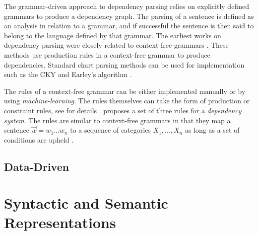 The grammar-driven approach to dependency parsing relies on explicitly defined grammars to produce a dependency graph. The parsing of a sentence is defined as an analysis in relation to a grammar, and if successful the sentence is then said to belong to the language defined by that grammar. The earliest works on dependency parsing were closely related to context-free grammars \cite{KublerEtAl:09}. These methods use production rules in a context-free grammar to produce dependencies. Standard chart parsing methods can be used for implementation such as the CKY \cite{Younger:67} and Earley's algorithm \cite{Early:70}.

The rules of a context-free grammar can be either implemented manually or by using \textit{machine-learning}. The rules themselves can take the form of production or constraint rules, see \citeauthor{KublerEtAl:09} for details \cite{KublerEtAl:09}. \citeauthor{Gaifman:65} proposes a set of three rules for a \textit{dependency system}. The rules are similar to context-free grammars in that they map a sentence $\vec{w} = w_1 ... w_n$ to a sequence of categories $X_1, ..., X_n$ as long as a set of conditions are upheld \cite{Gaifman:65}.

\subsection{Data-Driven}
\label{data-driven}

\section{Syntactic and Semantic Representations}
\label{syntactic-semantic}

\subsection{}
\label{}